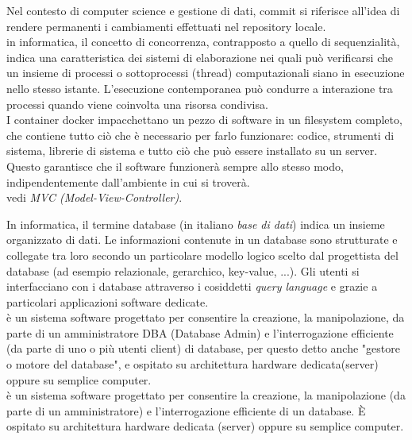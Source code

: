 \documentclass{scalatekids-article}
\begin{document}
 Nel contesto di computer science e gestione di dati, commit si riferisce all'idea di rendere permanenti i cambiamenti effettuati nel repository locale.
\\

 in informatica, il concetto di concorrenza, contrapposto a quello di sequenzialità, indica una caratteristica dei sistemi di elaborazione nei quali può verificarsi che un insieme di processi o sottoprocessi (thread) computazionali siano in esecuzione nello stesso istante.
L'esecuzione contemporanea può condurre a interazione tra processi quando viene coinvolta una risorsa condivisa.
\\

 I container docker impacchettano un pezzo di software in un filesystem completo, che contiene tutto ciò che è necessario per farlo funzionare: codice, strumenti di sistema, librerie di sistema e tutto ciò che può essere installato su un server.
Questo garantisce che il software funzionerà sempre allo stesso modo, indipendentemente dall'ambiente in cui si troverà.
\\

 vedi \textit{MVC (Model-View-Controller)}.
\\


 In informatica, il termine database (in italiano \textit{base di dati}) indica un insieme organizzato di dati.
Le informazioni contenute in un database sono strutturate e collegate tra loro secondo un particolare modello logico scelto dal progettista del database (ad esempio relazionale, gerarchico, key-value, ...).
Gli utenti si interfacciano con i database attraverso i cosiddetti \textit{query language} e grazie a particolari applicazioni software dedicate.
\\

 è un sistema software progettato per consentire la creazione, la manipolazione, da parte di un amministratore DBA (Database Admin) e l'interrogazione efficiente (da parte di uno o più utenti client) di database, per questo detto anche "gestore o motore del database", e ospitato su architettura hardware dedicata(server) oppure su semplice computer.
\\

 è un sistema software progettato per consentire la creazione, la manipolazione (da parte di un amministratore) e l'interrogazione efficiente di un database.
È ospitato su architettura hardware dedicata (server) oppure su semplice computer.
\\
\end{document}
